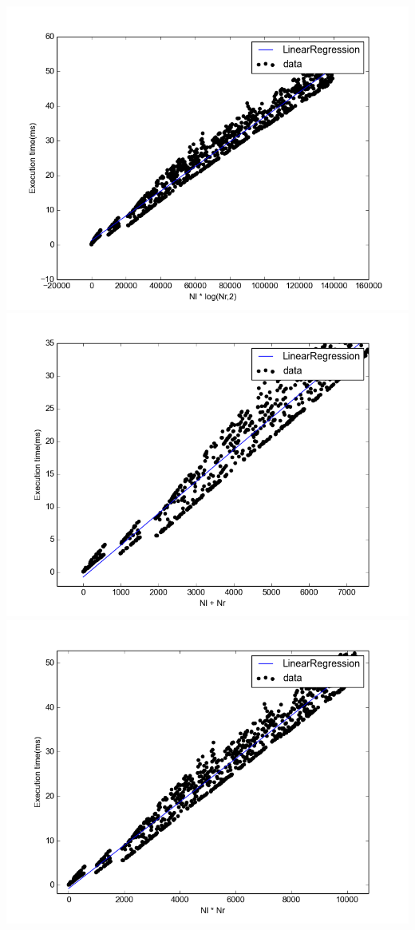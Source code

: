 \documentclass{article}
\begin{document}
\begin{multicols}{2}
	
	\includegraphics[scale=0.37]{Plots/nil-nlnrlog2.png}	
	\includegraphics[scale=0.37]{Plots/nil-nl+nr.png}	
	\includegraphics[scale=0.37]{Plots/nil-nlnr.png}	
	

\end{multicols}
\end{document}
